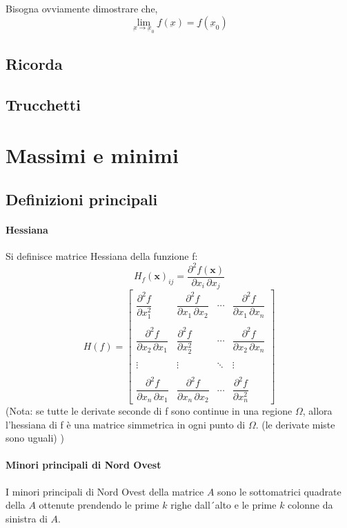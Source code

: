 \documentclass[a4paper,10pt]{book}
\newcommand{\ubar}{\underbar}
\begin{document}
Bisogna ovviamente dimostrare che, $$\lim_{\ubar{x}\rightarrow\ubar{x}_0}\ubar{f}(\ubar{x}) = \ubar{f}(\ubar{x}_0)$$
\subsection{Ricorda}

\subsection{Trucchetti}

\section{Massimi e minimi}
\subsection{Definizioni principali}

\paragraph{Hessiana}
Si definisce matrice Hessiana della funzione f:
$$  H_{f}(\mathbf{x})_{ij} = \frac{\partial^2 f(\mathbf{x})}{\partial x_i\, \partial x_j} $$
$$ H(f) = \begin{bmatrix} \dfrac{\partial^2 f}{\partial x_1^2} & \dfrac{\partial^2 f}{\partial x_1\,\partial x_2} & \cdots & \dfrac{\partial^2 f}{\partial x_1\,\partial x_n} \\ \\ \dfrac{\partial^2 f}{\partial x_2\,\partial x_1} & \dfrac{\partial^2 f}{\partial x_2^2} & \cdots & \dfrac{\partial^2 f}{\partial x_2\,\partial x_n} \\ \\ \vdots & \vdots & \ddots & \vdots \\ \\ \dfrac{\partial^2 f}{\partial x_n\,\partial x_1} & \dfrac{\partial^2 f}{\partial x_n\,\partial x_2} & \cdots & \dfrac{\partial^2 f}{\partial x_n^2} \end{bmatrix}$$
(Nota: se tutte le derivate seconde di f sono continue in una regione $\Omega$, allora l'hessiana di f è una matrice simmetrica in ogni punto di $\Omega$. (le derivate miste sono uguali) )

\paragraph{Minori principali di Nord Ovest}
I minori principali di Nord Ovest della matrice $A$ sono le sottomatrici quadrate della $A$ ottenute prendendo le prime $k$ righe dall´alto e le prime $k$ colonne da sinistra di $A$. 
\end{document}
